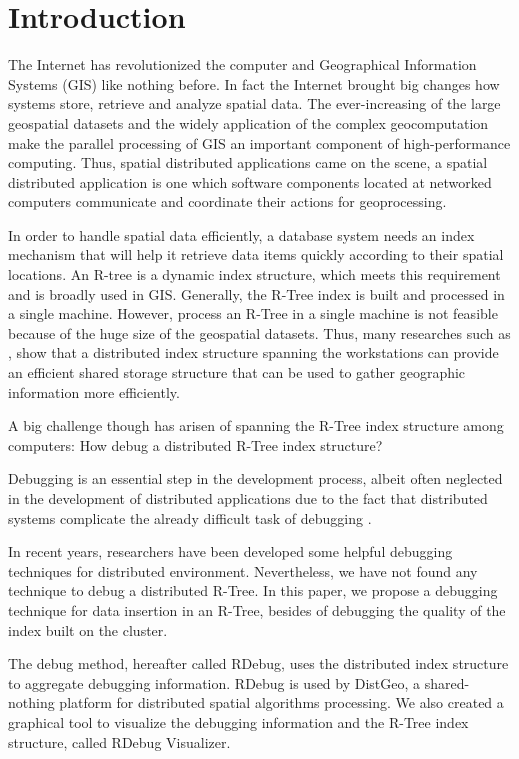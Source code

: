 \section{Introduction}
\label{sec:intro}

The Internet has revolutionized the computer and Geographical Information Systems (GIS) like nothing before. In fact the Internet brought big changes how systems store, retrieve and analyze spatial data. The ever-increasing of the large geospatial datasets and the widely application of the complex geocomputation make the parallel processing of GIS an important component of high-performance computing. Thus, spatial distributed applications came on the scene, a spatial distributed application is one which software components located at networked computers communicate and coordinate their actions for geoprocessing.

In order to handle spatial data efficiently, a database system needs an index mechanism that will help it retrieve data items quickly according to their spatial locations. An R-tree is a dynamic index structure, which meets this requirement and is broadly used in GIS. Generally, the R-Tree index is built and processed in a single machine. However, process an R-Tree in a single machine is not feasible because of the huge size of the geospatial datasets. Thus, many researches such as  \cite{an1999storing,dedsi,zhong2012towards}, show that a distributed index structure spanning the workstations can provide an efficient shared storage structure that can be used to gather geographic information more efficiently.

A big challenge though has arisen of spanning the R-Tree index structure among computers: How debug a distributed R-Tree index structure? 

Debugging is an essential step in the development process, albeit often neglected in the development of distributed applications due to the fact that distributed systems complicate the already difficult task of debugging \cite{cheung1990Framework}.

In recent years, researchers have been developed some helpful debugging techniques for distributed environment. Nevertheless, we have not found any technique to debug a distributed R-Tree. In this paper, we propose a debugging technique for data insertion in an R-Tree, besides of debugging the quality of the index built on the cluster.

The debug method, hereafter called RDebug, uses the distributed index structure to aggregate debugging information. RDebug is used by DistGeo, a shared-nothing platform for distributed spatial algorithms processing. We also created a graphical tool to visualize the debugging information and the R-Tree index structure, called RDebug Visualizer. 

